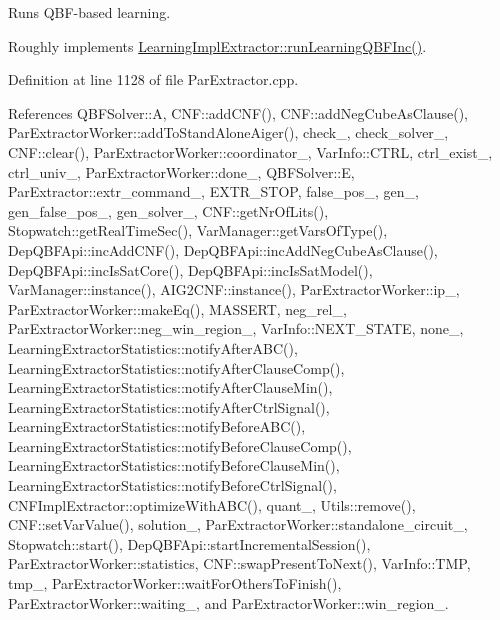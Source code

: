Runs Q\-B\-F-\/based learning. 

Roughly implements \hyperlink{classLearningImplExtractor_a3edc5671d6f56dea4145512385063681}{Learning\-Impl\-Extractor\-::run\-Learning\-Q\-B\-F\-Inc()}. 

Definition at line 1128 of file Par\-Extractor.\-cpp.



References Q\-B\-F\-Solver\-::\-A, C\-N\-F\-::add\-C\-N\-F(), C\-N\-F\-::add\-Neg\-Cube\-As\-Clause(), Par\-Extractor\-Worker\-::add\-To\-Stand\-Alone\-Aiger(), check\-\_\-, check\-\_\-solver\-\_\-, C\-N\-F\-::clear(), Par\-Extractor\-Worker\-::coordinator\-\_\-, Var\-Info\-::\-C\-T\-R\-L, ctrl\-\_\-exist\-\_\-, ctrl\-\_\-univ\-\_\-, Par\-Extractor\-Worker\-::done\-\_\-, Q\-B\-F\-Solver\-::\-E, Par\-Extractor\-::extr\-\_\-command\-\_\-, E\-X\-T\-R\-\_\-\-S\-T\-O\-P, false\-\_\-pos\-\_\-, gen\-\_\-, gen\-\_\-false\-\_\-pos\-\_\-, gen\-\_\-solver\-\_\-, C\-N\-F\-::get\-Nr\-Of\-Lits(), Stopwatch\-::get\-Real\-Time\-Sec(), Var\-Manager\-::get\-Vars\-Of\-Type(), Dep\-Q\-B\-F\-Api\-::inc\-Add\-C\-N\-F(), Dep\-Q\-B\-F\-Api\-::inc\-Add\-Neg\-Cube\-As\-Clause(), Dep\-Q\-B\-F\-Api\-::inc\-Is\-Sat\-Core(), Dep\-Q\-B\-F\-Api\-::inc\-Is\-Sat\-Model(), Var\-Manager\-::instance(), A\-I\-G2\-C\-N\-F\-::instance(), Par\-Extractor\-Worker\-::ip\-\_\-, Par\-Extractor\-Worker\-::make\-Eq(), M\-A\-S\-S\-E\-R\-T, neg\-\_\-rel\-\_\-, Par\-Extractor\-Worker\-::neg\-\_\-win\-\_\-region\-\_\-, Var\-Info\-::\-N\-E\-X\-T\-\_\-\-S\-T\-A\-T\-E, none\-\_\-, Learning\-Extractor\-Statistics\-::notify\-After\-A\-B\-C(), Learning\-Extractor\-Statistics\-::notify\-After\-Clause\-Comp(), Learning\-Extractor\-Statistics\-::notify\-After\-Clause\-Min(), Learning\-Extractor\-Statistics\-::notify\-After\-Ctrl\-Signal(), Learning\-Extractor\-Statistics\-::notify\-Before\-A\-B\-C(), Learning\-Extractor\-Statistics\-::notify\-Before\-Clause\-Comp(), Learning\-Extractor\-Statistics\-::notify\-Before\-Clause\-Min(), Learning\-Extractor\-Statistics\-::notify\-Before\-Ctrl\-Signal(), C\-N\-F\-Impl\-Extractor\-::optimize\-With\-A\-B\-C(), quant\-\_\-, Utils\-::remove(), C\-N\-F\-::set\-Var\-Value(), solution\-\_\-, Par\-Extractor\-Worker\-::standalone\-\_\-circuit\-\_\-, Stopwatch\-::start(), Dep\-Q\-B\-F\-Api\-::start\-Incremental\-Session(), Par\-Extractor\-Worker\-::statistics, C\-N\-F\-::swap\-Present\-To\-Next(), Var\-Info\-::\-T\-M\-P, tmp\-\_\-, Par\-Extractor\-Worker\-::wait\-For\-Others\-To\-Finish(), Par\-Extractor\-Worker\-::waiting\-\_\-, and Par\-Extractor\-Worker\-::win\-\_\-region\-\_\-.



